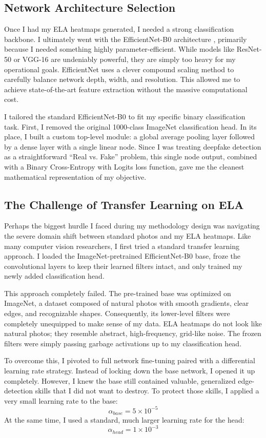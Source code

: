 \subsection{Network Architecture Selection}

Once I had my ELA heatmaps generated, I needed a strong classification backbone. I ultimately went with the EfficientNet-B0 architecture \cite{efficientnet}, primarily because I needed something highly parameter-efficient. While models like ResNet-50 or VGG-16 are undeniably powerful, they are simply too heavy for my operational goals. EfficientNet uses a clever compound scaling method to carefully balance network depth, width, and resolution. This allowed me to achieve state-of-the-art feature extraction without the massive computational cost.

I tailored the standard EfficientNet-B0 to fit my specific binary classification task. First, I removed the original 1000-class ImageNet classification head. In its place, I built a custom top-level module: a global average pooling layer followed by a dense layer with a single linear node. Since I was treating deepfake detection as a straightforward ``Real vs. Fake'' problem, this single node output, combined with a Binary Cross-Entropy with Logits loss function, gave me the cleanest mathematical representation of my objective.

\subsection{The Challenge of Transfer Learning on ELA}

Perhaps the biggest hurdle I faced during my methodology design was navigating the severe domain shift between standard photos and my ELA heatmaps. Like many computer vision researchers, I first tried a standard transfer learning approach. I loaded the ImageNet-pretrained EfficientNet-B0 base, froze the convolutional layers to keep their learned filters intact, and only trained my newly added classification head.

This approach completely failed. The pre-trained base was optimized on ImageNet, a dataset composed of natural photos with smooth gradients, clear edges, and recognizable shapes. Consequently, its lower-level filters were completely unequipped to make sense of my data. ELA heatmaps do not look like natural photos; they resemble abstract, high-frequency, grid-like noise. The frozen filters were simply passing garbage activations up to my classification head.

To overcome this, I pivoted to full network fine-tuning paired with a differential learning rate strategy. Instead of locking down the base network, I opened it up completely. However, I knew the base still contained valuable, generalized edge-detection skills that I did not want to destroy. To protect those skills, I applied a very small learning rate to the base:
\begin{equation}
    \alpha_{base} = 5 \times 10^{-5}
\end{equation}
At the same time, I used a standard, much larger learning rate for the head:
\begin{equation}
    \alpha_{head} = 1 \times 10^{-3}
\end{equation}
